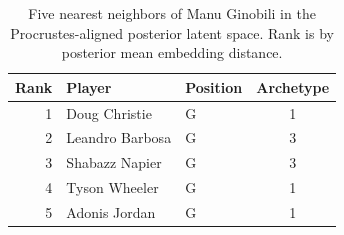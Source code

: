 \begin{table}[htbp]
  \centering\small
  \begin{tabular}{rllc}
    \toprule
    Rank & Player & Position & Archetype \\
    \midrule
    1 & Doug Christie & G & 1 \\
    2 & Leandro Barbosa & G & 3 \\
    3 & Shabazz Napier & G & 3 \\
    4 & Tyson Wheeler & G & 1 \\
    5 & Adonis Jordan & G & 1 \\
    \bottomrule
  \end{tabular}
  \caption{Five nearest neighbors of Manu Ginobili in the Procrustes-aligned posterior latent space. Rank is by posterior mean embedding distance.}
  \label{tab:Manu_Ginobili_neighbors}
\end{table}

